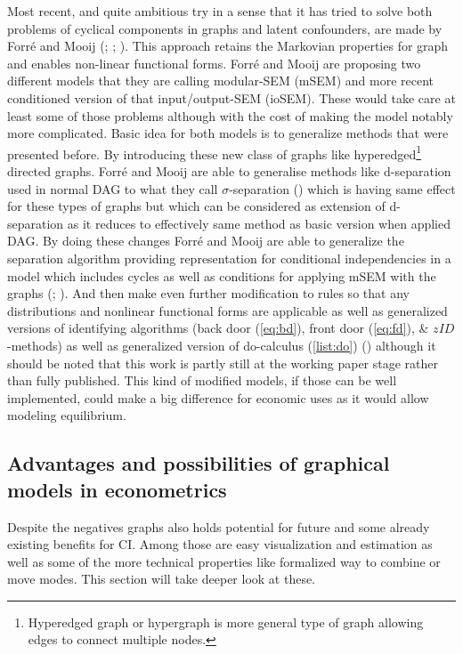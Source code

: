 \documentclass[main=english,12pt,a4paper,pdftex,econ,utf8]{aaltothesis}
\begin{document}
Most recent, and quite ambitious try in a sense that it has tried to solve both problems of cyclical components in graphs and latent confounders, are made by Forré and Mooij (\cite{Forre2017}; \cite{Forre2018}; \cite{Forre2019}). This approach retains the Markovian properties for graph and enables non-linear functional forms. Forré and Mooij are proposing two different models that they are calling modular-SEM (mSEM) and more recent conditioned version of that input/output-SEM (ioSEM). These would take care at least some of those problems although with the cost of making the model notably more complicated. Basic idea for both models is to generalize methods that were presented before. By introducing these new class of graphs like hyperedged\footnote{Hyperedged graph or hypergraph is more general type of graph allowing edges to connect multiple nodes.} directed graphs. Forré and Mooij are able to generalise methods like d-separation used in normal DAG to what they call $\sigma$-separation (\cite{Forre2017}) which is having same effect for these types of graphs but which can be considered as extension of d-separation as it reduces to effectively same method as basic version when applied DAG. By doing these changes Forré and Mooij are able to generalize the separation algorithm providing representation for conditional independencies in a model which includes cycles as well as conditions for applying mSEM with the graphs (\cite{Forre2017}; \cite{Forre2018}). And then make even further modification to rules so that any distributions and nonlinear functional forms are applicable as well as generalized versions of identifying algorithms (back door (\ref{eq:bd}), front door (\ref{eq:fd}), \& $zID$-methods) as well as generalized version of do-calculus (\ref{list:do}) (\cite{Forre2019}) although it should be noted that this work is partly still at the working paper stage rather than fully published. This kind of modified models, if those can be well implemented, could make a big difference for economic uses as it would allow modeling equilibrium.

\subsection{Advantages and possibilities of graphical models in econometrics} \label{subsection:benefits}

Despite the negatives graphs also holds potential for future and some already existing benefits for CI. Among those are easy visualization and estimation as well as some of the more technical properties like formalized way to combine or move modes. This section will take deeper look at these.
\end{document}
